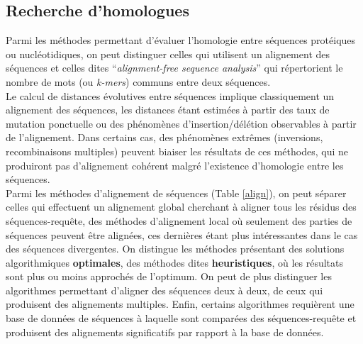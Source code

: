 \subsection{Recherche d'homologues}\label{paralgoalign}
	Parmi les méthodes permettant d'évaluer l'homologie entre séquences protéiques ou nucléotidiques, on peut distinguer celles qui utilisent un alignement des séquences et celles dites “\textit{alignment-free sequence analysis}” qui répertorient le nombre de mots (ou \textit{k-mers}) communs entre deux séquences.\\
	Le calcul de distances évolutives entre séquences implique classiquement un alignement des séquences, les distances étant estimées à partir des taux de mutation ponctuelle ou des phénomènes d'insertion/délétion observables à partir de l'alignement. Dans certains cas, des phénomènes extrêmes (inversions, recombinaisons multiples) peuvent biaiser les résultats de ces méthodes, qui ne produiront pas d'alignement cohérent malgré l'existence d'homologie entre les séquences.\\
	Parmi les méthodes d'alignement de séquences (Table \ref{align}), on peut séparer celles qui effectuent un alignement global cherchant à aligner tous les résidus des séquences-requête, des méthodes d'alignement local où seulement des parties de séquences peuvent être alignées, ces dernières étant plus intéressantes dans le cas des séquences divergentes. On distingue les méthodes présentant des solutions algorithmiques \textbf{optimales}, des méthodes dites \textbf{heuristiques}, où les résultats sont plus ou moins approchés de l'optimum. On peut de plus distinguer les algorithmes permettant d'aligner des séquences deux à deux, de ceux qui produisent des alignements multiples. Enfin, certains algorithmes requièrent une base de données de séquences à laquelle sont comparées des séquences-requête et produisent des alignements significatifs par rapport à la base de données. 

